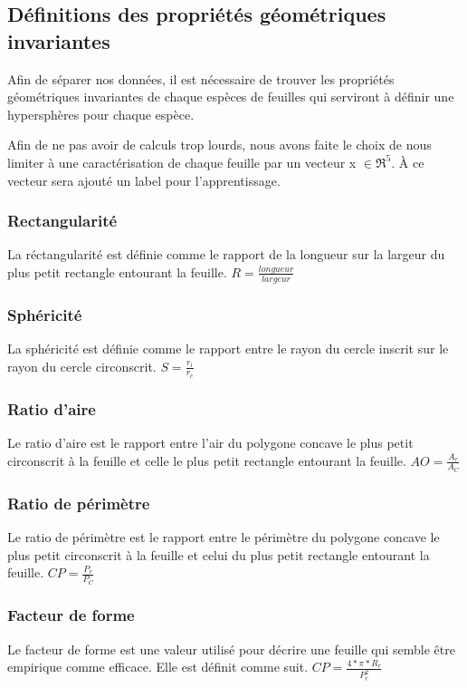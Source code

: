 \subsection{Définitions des propriétés géométriques invariantes}


Afin de séparer nos données, il est nécessaire de trouver les propriétés géométriques invariantes de chaque espèces de feuilles qui serviront à définir une hypersphères pour chaque espèce.

Afin de ne pas avoir de calculs trop lourds, nous avons faite le choix de nous limiter à une caractérisation de chaque feuille par un vecteur x $\in \Re ^{5}$. À ce vecteur sera ajouté un label pour l'apprentissage.

\subsubsection{Rectangularité}
La réctangularité est définie comme le rapport de la longueur sur la largeur du plus petit rectangle entourant la feuille.
\smallbreak
$R=\frac{longueur}{largeur}$
\subsubsection{Sphéricité}
La sphéricité est définie comme le rapport entre le rayon du cercle inscrit sur le rayon du cercle circonscrit.
\smallbreak
$S=\frac{r_{i}}{r_{c}}$
\subsubsection{Ratio d'aire}
Le ratio d'aire est le rapport entre l'air du polygone concave le plus petit circonscrit à la feuille et celle le plus petit rectangle entourant la feuille.
\smallbreak
$AO=\frac{A_{r}}{A_{C}}$
\subsubsection{Ratio de périmètre}
Le ratio de périmètre est le rapport entre le périmètre du polygone concave le plus petit circonscrit à la feuille et celui du plus petit rectangle entourant la feuille.
\smallbreak
$CP=\frac{P_{r}}{P_{C}}$
\subsubsection{Facteur de forme}
Le facteur de forme est une valeur utilisé pour décrire une feuille qui semble être empirique comme efficace. Elle est définit comme suit.
\smallbreak
$CP=\frac{4*\pi*R_{r}}{P_{r}^{2}}$